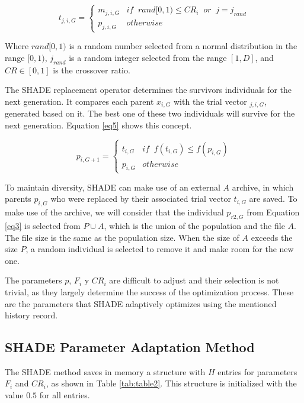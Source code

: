 \documentclass[review]{elsarticle}
\begin{document}
\begin{equation}
t_{j,i,G} = \left\{ \begin{array}{lc}
m_{j,i,G} &   if \;\; rand[0,1) \le CR_i \;\; or \;\;j = j_{rand} \\
p_{j,i,G} &  otherwise
\end{array}
\right.
\label{eq4}
\end{equation}

Where $rand[0,1)$ is a random number selected from a normal distribution in the range $[0,1)$, $j_{rand}$ is a random integer selected from the range $[1,D]$, and $CR \in [0,1]$ is the crossover ratio.

The SHADE replacement operator determines the survivors individuals for the next generation. It compares each parent $x_{i,G}$ with the trial vector $_{j,i,G}$, generated based on it. The best one of these two individuals will survive for the next generation. Equation \eqref{eq5} shows this concept.

\begin{equation}
p_{i,G + 1} = \left\{ \begin{array}{lc}
t_{i,G} &   if \;\; f(t_{i,G}) \le f(p_{i,G}) \\
p_{i,G} &  otherwise
\end{array}
\right.
\label{eq5}
\end{equation}

To maintain diversity, SHADE can make use of an external $A$ archive, in which parents $p_{i,G}$ who were replaced by their associated trial vector $t_{i,G}$ are saved. To make use of the archive, we will consider that the individual $p_{r2,G}$ from Equation \eqref{eq3} is selected from $P \cup A$, which is the union of the population and the file $A$. The file size is the same as the population size. When the size of $A$ exceeds the size $P$, a random individual is selected to remove it and make room for the new one.

The parameters $p$, $F_i$ y $CR_i$ are difficult to adjust and their selection is not trivial, as they largely determine the success of the optimization process. These are the parameters that SHADE adaptively optimizes using the mentioned history record.

\subsection{SHADE Parameter Adaptation Method}

The SHADE method saves in memory a structure with $H$ entries for parameters $F_i$ and $CR_i$, as shown in Table \ref{tab:table2}. This structure is initialized with the value $0.5$ for all entries.
\end{document}

